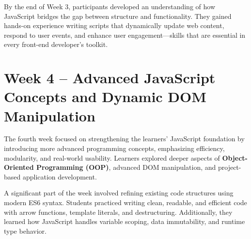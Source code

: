 \documentclass[a4paper,12pt,oneside]{report}
\numberwithin{equation}{chapter}
\numberwithin{figure}{chapter}
\numberwithin{table}{chapter}
\begin{document}
By the end of Week 3, participants developed an understanding of how JavaScript bridges the gap between structure and functionality. They gained hands-on experience writing scripts that dynamically update web content, respond to user events, and enhance user engagement—skills that are essential in every front-end developer’s toolkit.

\vspace{5mm}
\noindent
\section{Week 4 – Advanced JavaScript Concepts and Dynamic DOM Manipulation}

The fourth week focused on strengthening the learners’ JavaScript foundation by introducing more advanced programming concepts, emphasizing efficiency, modularity, and real-world usability. Learners explored deeper aspects of \textbf{Object-Oriented Programming (OOP)}, advanced DOM manipulation, and project-based application development.

A significant part of the week involved refining existing code structures using modern ES6 syntax. Students practiced writing clean, readable, and efficient code with arrow functions, template literals, and destructuring. Additionally, they learned how JavaScript handles variable scoping, data immutability, and runtime type behavior.
\end{document}
